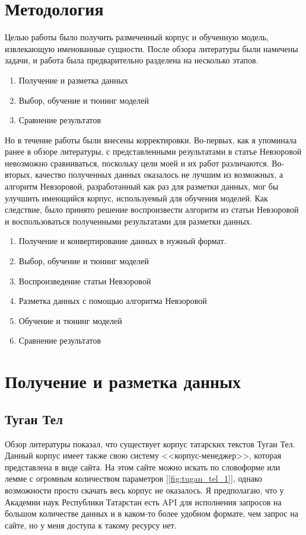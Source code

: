 \section{Методология}

Целью работы было получить размеченный корпус и обученную модель, извлекающую именованные сущности. После обзора литературы были намечены задачи, и работа была предварительно разделена на несколько этапов.

\begin{enumerate}
\item Получение и разметка данных
\item Выбор, обучение и тюнинг моделей
\item Сравнение результатов
\end{enumerate}

Но в течение работы были внесены корректировки. Во-первых, как я упоминала ранее в обзоре литературы, с представленными результатами в статье Невзоровой невозможно сравниваться, поскольку цели моей и их работ различаются. Во-вторых, качество полученных данных оказалось не лучшим из возможных, а алгоритм Невзоровой, разработанный как раз для разметки данных, мог бы улучшить имеющийся корпус, используемый для обучения моделей. Как следствие, было принято решение воспроизвести алгоритм из статьи Невзоровой и воспользоваться полученными результатами для разметки данных.

\begin{enumerate}
\item Получение и конвертирование данных в нужный формат.
\item Выбор, обучение и тюнинг моделей
\item Воспроизведение статьи Невзоровой
\item Разметка данных с помощью алгоритма Невзоровой
\item Обучение и тюнинг моделей
\item Сравнение результатов
\end{enumerate}


\section{Получение и разметка данных}

\subsection{Туган Тел}

Обзор литературы показал, что существует корпус татарских текстов Туган Тел\cite{tugan_tel}. Данный корпус имеет также свою систему <<корпус-менеджер>>, которая представлена в виде сайта. На этом сайте можно искать по словоформе или лемме с огромным количеством параметров [\ref{fig:tugan_tel_1}], однако возможности просто скачать весь корпус не оказалось. Я предполагаю, что у Академии наук Республики Татарстан есть API для исполнения запросов на большом количестве данных и в каком-то более удобном формате, чем запрос на сайте, но у меня доступа к такому ресурсу нет. 

